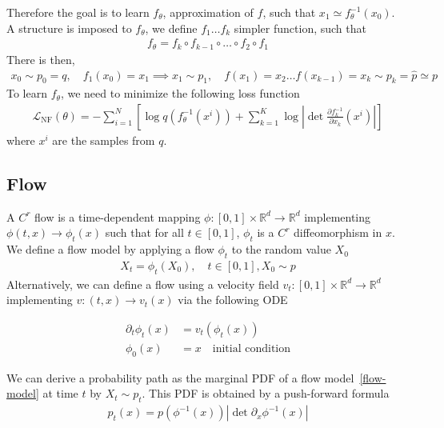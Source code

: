 \documentclass{article}
\begin{document}
Therefore the goal is to learn \(f_\theta\), approximation of \(f\), such that \(x_1 \simeq f_\theta^{-1}(x_0)\). \\
A structure is imposed to $f_\theta$, we define $f_1\ldots f_k$ simpler function,  such that
\begin{align}
    f_\theta = f_k\circ f_{k-1}\circ\ldots\circ f_2\circ f_1
\end{align}
There is then, 
\begin{align}
    x_0\sim p_0=q, \quad f_1(x_0) = x_1 \implies x_1\sim p_1,\quad f(x_1)=x_2 \ldots f(x_{k-1})=x_k \sim p_k = \hat{p} \simeq p
\end{align}
To learn \(f_\theta\), we need to minimize the following loss function
\begin{align}
    \mathcal{L}_\text{NF}(\theta) = -\sum_{i=1}^N \left[ \log q(f_\theta^{-1}(x^i)) + \sum_{k=1}^K \log \left| \det\frac{\partial f_k^{-1}}{\partial x_k}(x^i) \right| \right] 
\end{align}
where \(x^i\) are the samples from \(q\). \\


\subsection{Flow}
A $C^r$ flow is a time-dependent mapping $\phi : [0,1]\times \mathbb{R}^d\rightarrow\mathbb{R}^d$ implementing $\phi(t,x) \rightarrow \phi_t(x)$ such that for all $t\in[0,1]$, $\phi_t$ is a $C^r$ diffeomorphism in $x$.
We define a flow model by applying a flow $\phi_t$ to the random value $X_0$
\begin{align}\label{flow-model}
    X_t=\phi_t(X_0), \quad t \in[0,1], X_0\sim p 
\end{align}
Alternatively, we can define a flow using a velocity field \(v_t:[0,1]\times\mathbb{R}^d\rightarrow \mathbb{R}^d\) implementing \(v:(t,x)\rightarrow v_t(x)\) via the following ODE 

\begin{align}\label{ODE}
    \partial_t \phi_t(x)&=v_t(\phi_t(x))\\
    \phi_0(x)&=x \quad \text{initial condition}
\end{align}

We can derive a probability path as the marginal PDF of a flow model~\ref{flow-model} at time \(t\) by \(X_t\sim p_t\). This PDF is obtained by a push-forward formula 
\begin{align}\label{pushforward}
    p_t(x) = p(\phi^{-1}(x))|\det \partial_x \phi^{-1}(x)|
\end{align} 
\end{document}
